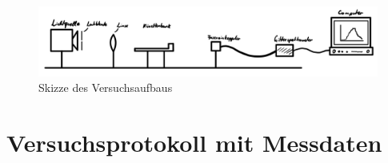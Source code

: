 \documentclass{article}
\begin{document}
\newpage

\begin{figure} [h]
    \centering
    \includegraphics[width=\textwidth]{graphics/dia1.jpg}
    \caption{Skizze des Versuchsaufbaus}
\end{figure}

\newpage

\newpage

\section{Versuchsprotokoll mit Messdaten}
\end{document}
